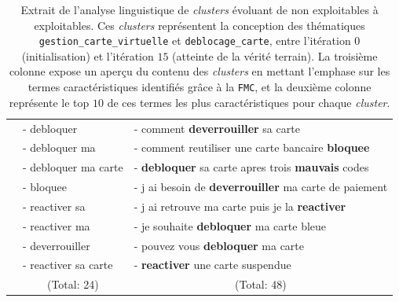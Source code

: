 \begin{table}[!htb]
\begin{center}
\begin{tabular}{|c|l|l|}
						& { \scriptsize - debloquer }
						& { \scriptsize - comment \textbf{deverrouiller} sa carte }
						\tabularnewline
						
						& { \scriptsize - debloquer ma }
						& { \scriptsize - comment reutiliser une carte bancaire \textbf{bloquee} }
						\tabularnewline
						
						& { \scriptsize - debloquer ma carte }
						& { \scriptsize - \textbf{debloquer} sa carte apres trois \textbf{mauvais} codes }
						\tabularnewline
						
						& { \scriptsize - bloquee }
						& { \scriptsize - j ai besoin de \textbf{deverrouiller} ma carte de paiement }
						\tabularnewline
						
						& { \scriptsize - reactiver sa }
						& { \scriptsize - j ai retrouve ma carte puis je la \textbf{reactiver} }
						\tabularnewline
						
						& { \scriptsize - reactiver ma }
						& { \scriptsize - je souhaite \textbf{debloquer} ma carte bleue }
						\tabularnewline
						
						& { \scriptsize - deverrouiller }
						& { \scriptsize - pouvez vous \textbf{debloquer} ma carte }
						\tabularnewline
						
						& { \scriptsize - reactiver sa carte }
						& { \scriptsize - \textbf{reactiver} une carte suspendue }
						\tabularnewline
						
						& \multicolumn{1}{c|}{
							\scriptsize (Total: 24)
						}
						& \multicolumn{1}{c|}{
							\scriptsize (Total: 48)
						}
						\tabularnewline
						\hline
					
				\end{tabular}
				\end{center}
				\caption{
					Extrait de l'analyse linguistique de \textit{clusters} évoluant de non exploitables à exploitables.
					Ces \textit{clusters} représentent la conception des thématiques \texttt{gestion\_carte\_virtuelle} et \texttt{deblocage\_carte}, entre l'itération $0$ (initialisation) et l'itération $15$ (atteinte de la vérité terrain).
					La troisième colonne expose un aperçu du contenu des \textit{clusters} en mettant l'emphase sur les termes caractéristiques identifiés grâce à la \texttt{FMC}, et la deuxième colonne représente le top $10$ de ces termes les plus caractéristiques pour chaque \textit{cluster}.
				}
				\label{table:4.4.2-ETUDE-PERTINENCE-PATTERNS-LINGUISTIQUES-DEBLOCAGE-CARTE-GESTION-CARTE-VIRTUELLE}
			\end{table}

